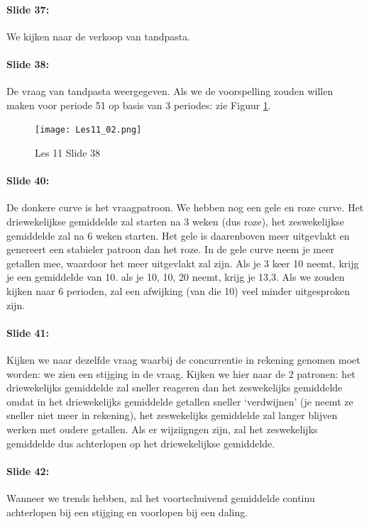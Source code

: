 \documentclass[10pt,a4paper]{report}
\begin{document}
\paragraph{Slide 37:} We kijken naar de verkoop van tandpasta. 

\paragraph{Slide 38:} De vraag van tandpasta weergegeven. Als we de voorspelling zouden willen maken voor periode 51 op basis van 3 periodes: zie Figuur \ref{les11_02}.

\begin{figure}[h!]
\centering
\texttt{[image: Les11\_02.png]}
\caption{Les 11 Slide 38} 
\label{les11_02}
\end{figure}

\paragraph{Slide 40:} De donkere curve is het vraagpatroon. We hebben nog een gele en roze curve. Het driewekelijkse gemiddelde zal starten na 3 weken (dus roze), het zeswekelijkse gemiddelde zal na 6 weken starten. Het gele is daarenboven meer uitgevlakt en genereert een stabieler patroon dan het roze. In de gele curve neem je meer getallen mee, waardoor het meer uitgevlakt zal zijn. Als je 3 keer 10 neemt, krijg je een gemiddelde van 10. als je 10, 10, 20 neemt, krijg je 13,3. Als we zouden kijken naar 6 perioden, zal een afwijking (van die 10) veel minder uitgesproken zijn. 

\paragraph{Slide 41:} Kijken we naar dezelfde vraag waarbij de concurrentie in rekening genomen moet worden: we zien een stijging in de vraag. Kijken we hier naar de 2 patronen: het driewekelijks gemiddelde zal sneller reageren dan het zeswekelijks gemiddelde omdat in het driewekelijks gemiddelde getallen sneller `verdwijnen' (je neemt ze sneller niet meer in rekening), het zeswekelijks gemiddelde zal langer blijven werken met oudere getallen. Als er wijziigngen zijn, zal het zeswekelijks gemiddelde dus achterlopen op het driewekelijkse gemiddelde.

\paragraph{Slide 42:} Wanneer we trends hebben, zal het voortschuivend gemiddelde continu achterlopen bij een stijging en voorlopen bij een daling.
\end{document}
